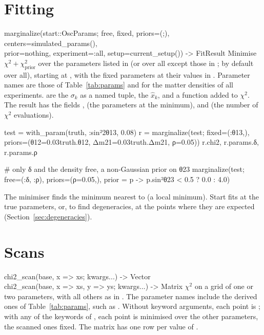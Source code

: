 \section{Fitting}

\begin{apifun}{marginalize(start::OscParams; free, fixed, priors=(;), centers=simulated\_params(),\\
\phantom{marginalize(}prior=nothing, experiment=:all, setup=current\_setup()) -> FitResult}
Minimise $\chi^2+\chi^2_\text{prior}$ over the parameters listed in
 (or over all except those in ; by default over all),
starting at , with the fixed parameters at their values in
. Parameter names are those of Table~\ref{tab:params} and
 for the matter densities of all experiments.
 are the $\sigma_k$ as a named tuple,  the
$\hat x_k$, and  a function  added to
$\chi^2$. The result has the fields ,  (the parameters
at the minimum),  and  (the number of $\chi^2$
evaluations).
\end{apifun}

\begin{julia}
test = with_param(truth, :sin²2θ13, 0.08)
r = marginalize(test; fixed=(:θ13,),
                priors=(θ12=0.03truth.θ12, Δm21=0.03truth.Δm21, ρ=0.05))
r.chi2, r.params.δ, r.params.ρ

# only δ and the density free, a non-Gaussian prior on θ23
marginalize(test; free=(:δ, :ρ), priors=(ρ=0.05,),
            prior = p -> p.sin²θ23 < 0.5 ? 0.0 : 4.0)
\end{julia}

\begin{note}
The minimiser finds the minimum nearest to  (a local minimum).
Start fits at the true parameters, or, to find degeneracies, at the points
where they are expected (Section~\ref{sec:degeneracies}).
\end{note}

\section{Scans}

\begin{apifun}{chi2\_scan(base, x => xs; kwargs...) -> Vector\\
chi2\_scan(base, x => xs, y => ys; kwargs...) -> Matrix}
$\chi^2$ on a grid of one or two parameters, with all others as in
. The parameter names include the derived ones of
Table~\ref{tab:params}, such as . Without keyword arguments,
each point is ; with any of the keywords of ,
each point is minimised over the other parameters, the scanned ones fixed.
The matrix has one row per value of .
\end{apifun}

